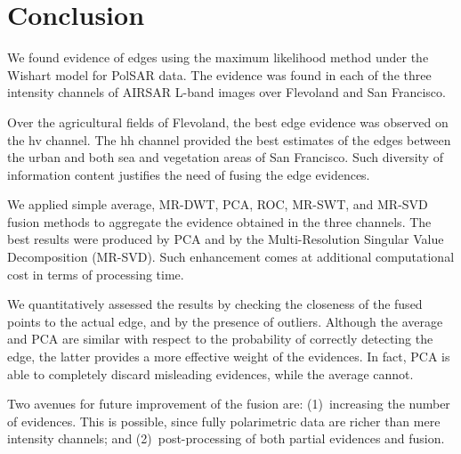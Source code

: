 \documentclass[journal]{IEEEtran}
\begin{document}
\section{Conclusion}\label{sec_06}

We found evidence of edges using the maximum likelihood method under the Wishart model for PolSAR data. 
The evidence was found in each of the three intensity channels of AIRSAR L-band images over Flevoland and San Francisco.

Over the agricultural fields of Flevoland, the best edge evidence was observed on the hv channel. 
The hh channel provided the best estimates of the edges between the urban and both sea and vegetation areas of San Francisco.
Such diversity of information content justifies the need of fusing the edge evidences.

We applied simple average, MR-DWT, PCA, ROC, MR-SWT, and MR-SVD fusion methods to aggregate the evidence obtained in the three channels.
The best results were produced by PCA and by the Multi-Resolution Singular Value Decomposition (MR-SVD).
Such enhancement comes at additional computational cost in terms of processing time.

We quantitatively assessed the results by checking the closeness of the fused points to the actual edge, and by the presence of outliers.
Although the average and PCA are similar with respect to the probability of correctly detecting the edge, the latter provides a more effective weight of the evidences.
In fact, PCA is able to completely discard misleading evidences, while the average cannot.


Two avenues for future improvement of the fusion are:
(1)~increasing the number of evidences.
	This is possible, since fully polarimetric data are richer than mere intensity channels; and
(2)~post-processing of both partial evidences and fusion.



\end{document}
